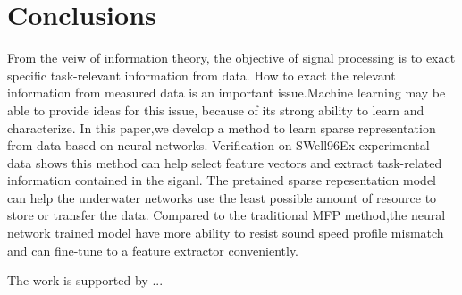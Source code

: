 \section{Conclusions}
From the veiw of information theory, the objective of signal processing is to exact specific task-relevant information from data.
How to exact the relevant information from measured data is an important issue.Machine learning may be able to provide ideas for this issue, because of its strong ability to learn and characterize.
In this paper,we develop a method to learn sparse representation from data based on neural networks.
Verification on SWell96Ex experimental data shows this method can help select feature vectors and extract task-related information contained in the siganl. The pretained sparse repesentation model can help the underwater networks use the least possible amount of resource to store or transfer the data. Compared to the traditional MFP method,the neural network trained model have more ability to resist sound speed profile mismatch and can fine-tune to a feature extractor conveniently.

\begin{acks}
The work is supported by ...

\end{acks}
